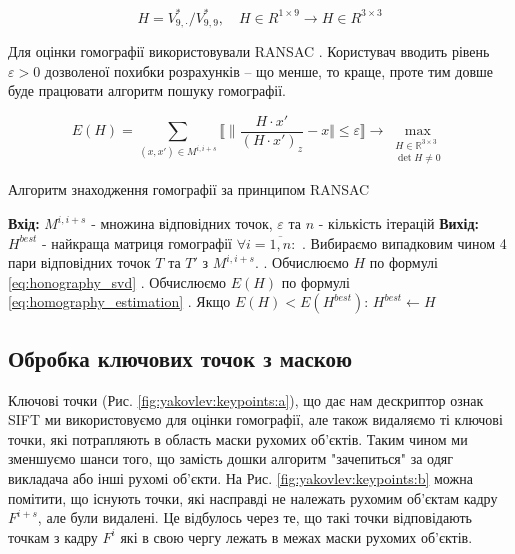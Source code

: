 \begin{equation}
    H = V^{*}_{9,\cdot }/V^{*}_{9,9},\quad H \in R^{1 \times 9} \rightarrow H \in R^{3 \times 3}
    \label{eq:honography_svd}
\end{equation}


Для оцінки гомографії використовували RANSAC \cite{ransac}.
Користувач вводить рівень \(\varepsilon > 0\)
дозволеної похибки розрахунків -- що менше, то краще, проте тим довше
буде працювати алгоритм пошуку гомографії.

\begin{equation}
    E(H) = \sum_{(x,x') \in M^{i,i+s}}
    \llbracket \|
    \frac{H\cdot x'}{(H\cdot x')_z} - x
    \Vert \leq \varepsilon
    \rrbracket
    \to \max\limits_{\substack{H \in \mathbb{R}^{3 \times 3} \\ \det{H} \neq 0}}
    \label{eq:homography_estimation}
\end{equation}

\begin{algorithm}[H]
    \caption{Алгоритм знаходження гомографії за принципом RANSAC}
    \begin{algorithmic}
        \State \textbf{Вхід:} $M^{i,i+s}$ - множина відповідних точок, $\varepsilon$ та $n$ - кількість ітерацій
        \State \textbf{Вихід:} $H^{best}$ - найкраща матриця гомографії
        \State $\forall i = \overline{1,n}:$
        \State {}. Вибираємо випадковим чином 4 пари відповідних точок $T$ та $T'$ з $M^{i,i+s}$.
        \State {}. Обчислюємо $H$ по формулі \ref{eq:honography_svd}
        \State {}. Обчислюємо $E(H)$ по формулі \ref{eq:homography_estimation}
        \State {}. Якщо  $E(H) < E(H^{best})$:
        \State \quad \quad $H^{best} \gets H$
    \end{algorithmic}
\end{algorithm}


\subsection{Обробка ключових точок з маскою}

Ключові точки (Рис. \ref{fig:yakovlev:keypoints:a}), що дає нам дескриптор ознак SIFT  ми
використовуємо для оцінки гомографії, але також видаляємо ті ключові
точки, які потрапляють в область маски рухомих об'єктів.
Таким чином ми зменшуємо шанси того, що замість дошки алгоритм "зачепиться" за одяг
викладача або інші рухомі об'єкти. На Рис. \ref{fig:yakovlev:keypoints:b} можна помітити, що
існують точки, які насправді не належать рухомим об'єктам кадру
\(F^{i + s}\), але були видалені. Це відбулось через те, що такі точки
відповідають точкам з кадру \(F^{i}\) які в свою чергу лежать в межах маски рухомих
об'єктів.

